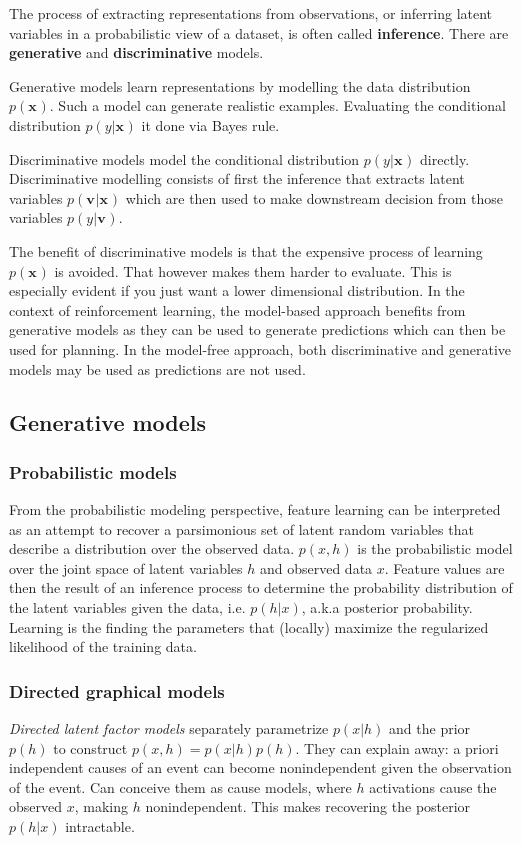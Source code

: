 The process of extracting representations from observations,
or inferring latent variables in a probabilistic view of a dataset,  is often called \textbf{inference}.
There are \textbf{generative} and \textbf{discriminative} models.

Generative models learn representations by modelling the data distribution
$ p(\bm{x}_{})  $. Such a model can generate realistic examples.
Evaluating the conditional distribution $ p (y | \bm{x}_{})  $
it done via Bayes rule.

Discriminative models model the conditional distribution $ p (y | \bm{x}_{})  $
directly.
Discriminative modelling consists of first the inference
that extracts latent variables
$ p(\bm{v}_{}| \bm{x}_{})  $
which are then used to make downstream decision
from those variables $ p (y|\bm{v}_{})  $.

The benefit of discriminative models is that 
the expensive process of learning $ p (\bm{x}_{})  $ is avoided.
That however makes them harder to evaluate.
This is especially evident if you just want a lower dimensional distribution.
In the context of reinforcement learning, the model-based approach 
benefits from generative models as they can be used to generate predictions
which can then be used for planning.
In the model-free approach, both discriminative and generative models may be used
as predictions are not used.


\subsection{Generative models}
\subsubsection{Probabilistic models}
\label{subsub-probabilistic-models}
From the probabilistic modeling perspective, feature learning
can be interpreted as an attempt to recover a parsimonious set of latent random
variables that describe a distribution over the observed data.
$ p (x,h)  $ is the probabilistic model over the joint space
of latent variables $ h  $ and observed data $ x  $.
Feature values are then the result of an inference process to determine the probability
distribution of the latent variables given the data, i.e. $ p (h|x)  $,
a.k.a posterior probability.
Learning is the finding the parameters
that (locally) maximize the regularized likelihood of the training data.

\subsubsection{Directed graphical models}
\textit{Directed latent factor models} separately parametrize
$ p (x|h)  $ and the prior $ p (h)  $ to construct
$ p (x,h) = p (x|h) p (h)  $.
They can explain away: a priori independent causes of an event
can become nonindependent given the observation of the event.
Can conceive them as cause models, where $ h  $ activations
cause the observed $ x  $, making $ h  $ nonindependent.
This makes recovering the posterior $ p (h|x)  $ intractable.

